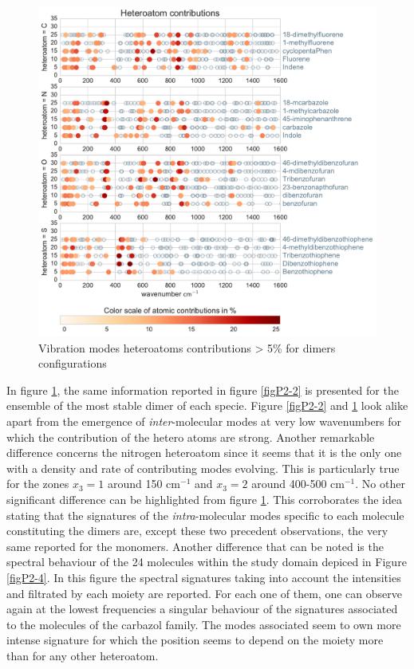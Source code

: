 	
	
	
		\begin{figure}[H]
			\begin{center}
				\includegraphics[scale=0.55]{image/P2-3}
			\end{center}
			\caption{Vibration modes heteroatoms contributions > 5\% for dimers configurations}  \label{figP2-3}
		\end{figure}
	
	
In figure \ref{figP2-3}, the same information reported in figure \ref{figP2-2} is presented for the ensemble of the most stable dimer of each specie. Figure \ref{figP2-2} and \ref{figP2-3} look alike apart from the emergence of \textit{inter}-molecular modes at very low wavenumbers for which the contribution of the hetero atoms are strong. Another remarkable difference concerns the nitrogen heteroatom since it seems that it is the only one with a density and rate of contributing modes evolving. This is particularly true for the zones $x_3=1$ around 150 cm$^{-1}$ and $x_3=2$ around 400-500 cm$^{-1}$. No other significant difference can be highlighted from figure \ref{figP2-3}. This corroborates the idea stating that the signatures of the \textit{intra}-molecular modes specific to each molecule constituting the dimers are, except these two precedent observations, the very same reported for the monomers. 
Another difference that can be noted is the spectral behaviour of the 24 molecules within the study domain depiced in Figure \ref{figP2-4}. In this figure the spectral signatures taking into account the intensities and filtrated by each moiety are reported. For each one of them, one can observe again at the lowest frequencies a singular behaviour of the signatures associated to the molecules of the carbazol family. The modes associated seem to own more intense signature for which the position seems to depend on the moiety more than for any other heteroatom.	
	
